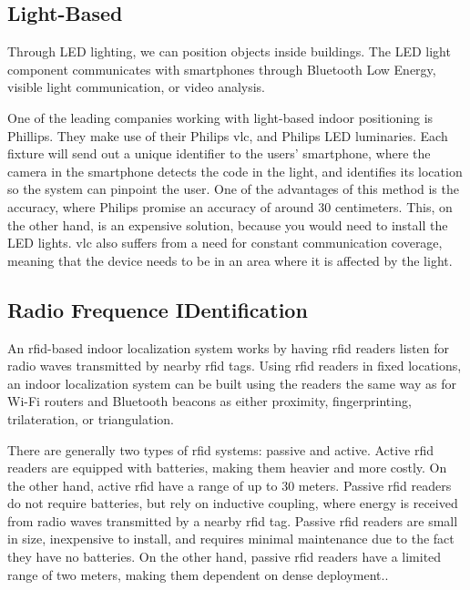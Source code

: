
\subsection{Light-Based} \label{light-based}
Through LED lighting, we can position objects inside buildings. The LED light component communicates with smartphones through Bluetooth Low Energy, visible light communication, or video analysis.\cite{IPSMapsPeople}

One of the leading companies working with light-based indoor positioning is Phillips. They make use of their Philips \gls{vlc}, and Philips LED luminaries. Each fixture will send out a unique identifier to the users' smartphone, where the camera in the smartphone detects the code in the light, and identifies its location so the system can pinpoint the user.\cite{philips} One of the advantages of this method is the accuracy, where Philips promise an accuracy of around 30 centimeters.\cite{IPSMapsPeople} This, on the other hand, is an expensive solution, because you would need to install the LED lights. \gls{vlc} also suffers from a need for constant communication coverage, meaning that the device needs to be in an area where it is affected by the light.\cite{9249516}


\subsection{Radio Frequence IDentification}
An \gls{rfid}-based indoor localization system works by having \gls{rfid} readers listen for radio waves transmitted by nearby \gls{rfid} tags. Using \gls{rfid} readers in fixed locations, an indoor localization system can be built using the readers the same way as for Wi-Fi routers and Bluetooth beacons as either proximity, fingerprinting, trilateration, or triangulation.\cite{HabilitationThesis}

There are generally two types of \gls{rfid} systems: passive and active. Active \gls{rfid} readers are equipped with batteries, making them heavier and more costly. On the other hand, active \gls{rfid} have a range of up to 30 meters. Passive \gls{rfid} readers do not require batteries, but rely on inductive coupling, where energy is received from radio waves transmitted by a nearby \gls{rfid} tag. Passive \gls{rfid} readers are small in size, inexpensive to install, and requires minimal maintenance due to the fact they have no batteries. On the other hand, passive \gls{rfid} readers have a limited range of two meters, making them dependent on dense deployment.\cite{HabilitationThesis}.

